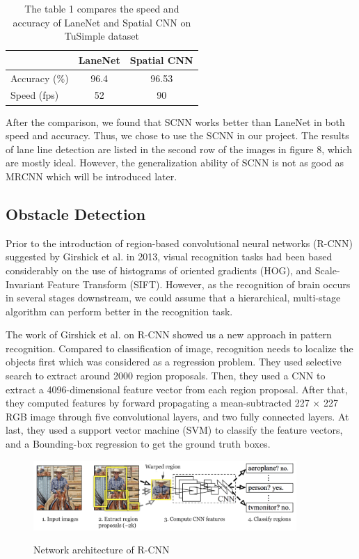 \documentclass[runningheads]{llncs}
\begin{document}
\begin{table}[!htbp]
	\centering
	\caption{The table 1 compares the speed and accuracy of LaneNet and Spatial CNN on TuSimple dataset}
	\begin{tabular}{|l|c|c|}
		\hline 
		&LaneNet&Spatial CNN\\
		\hline  
		Accuracy (\%)&96.4&96.53\\
		\hline  
		Speed (fps)&52&90\\
		\hline 
	\end{tabular}
\end{table}

After the comparison, we found that SCNN works better than 
LaneNet in both speed and accuracy. Thus, we chose to use 
the SCNN in our project. The results of lane line detection 
are listed in the second row of the images in figure 8, 
which are mostly ideal. However, the generalization ability 
of SCNN is not as good as MRCNN which will be introduced 
later. 


\subsection{Obstacle Detection}
Prior to the introduction of region-based convolutional 
neural networks (R-CNN) suggested by Girshick et al. 
\cite{RCNN} in 2013, visual recognition tasks had been 
based considerably on the use of histograms of oriented 
gradients (HOG)\cite{HOG}, and Scale-Invariant Feature 
Transform (SIFT)\cite{SIFT}. However, as the recognition of 
brain occurs in several stages downstream, we could assume 
that a hierarchical, multi-stage algorithm can perform better 
in the recognition task. 

The work of Girshick et al. on R-CNN showed us a new 
approach in pattern recognition. Compared to classification 
of image, recognition needs to localize the objects first 
which was considered as a regression problem. They used 
selective search to extract around 2000 region proposals. 
Then, they used a CNN to extract a 4096-dimensional feature 
vector from each region proposal. After that, they computed 
features by forward propagating a mean-subtracted 227 × 227 
RGB image through five convolutional layers, and two fully 
connected layers. At last, they used a support vector 
machine (SVM) to classify the feature vectors, and a 
Bounding-box regression to get the ground truth boxes. 

\begin{figure}
    \centering
    \includegraphics[width=10cm]{reference/rcnn}
    \label{fig:RCNN}
    \caption{Network architecture of R-CNN\cite{RCNN}}
\end{figure}
\end{document}
